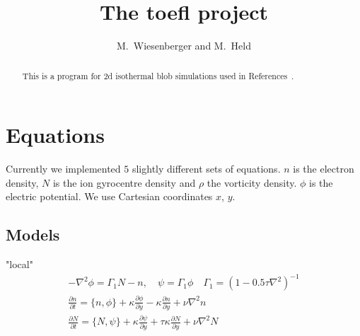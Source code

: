 


\usepackage{minted}



\title{The toefl project}
\author{ M.~Wiesenberger and M.~Held}
\maketitle

\begin{abstract}
  This is a program for 2d isothermal blob simulations used in References~\cite{Wiesenberger2014,Kube2016,Wiesenberger2017a}.
\end{abstract}

\section{Equations}
Currently we implemented $5$ slightly different sets of equations. $n$ is the electron density, $N$ is the ion gyrocentre density and $\rho$
the vorticity density. $\phi$ is the electric potential. We
use Cartesian coordinates $x$, $y$.
\subsection{Models}

"local"
\begin{subequations}
\begin{align}
 -\nabla^2 \phi =  \Gamma_1 N -n, \quad
\psi = \Gamma_1 \phi \quad \Gamma_1 = ( 1- 0.5\tau\nabla^2)^{-1} \\
 \frac{\partial n}{\partial t}     = 
    \{ n, \phi\} 
  + \kappa \frac{\partial \phi}{\partial y} 
  -\kappa \frac{\partial n}{\partial y}
  + \nu \nabla^2 n  \\
  \frac{\partial N}{\partial t} =
  \{ N, \psi\} 
  + \kappa \frac{\partial \psi}{\partial y} 
  + \tau \kappa\frac{\partial N}{\partial y} +\nu\nabla^2N
\end{align}
\end{subequations}


